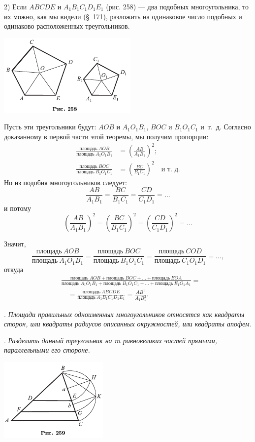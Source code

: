 \documentclass[oneside]{book}
\begin{document}
2) Если $ABCDE$ и $A_1B_1C_1D_1E_1$ (рис. 258) — два подобных многоугольника, то их можно, как мы видели (§~171), разложить на одинаковое число подобных и одинаково расположенных треугольников.

\includegraphics{pics/ris-258}

Пусть эти треугольники будут:
$AOB$ и $A_1O_1B_1$, $BOC$ и $B_1O_1C_1$ и~т.~д.
Согласно доказанному в первой части этой теоремы, мы получим пропорции:
\begin{align*}
\frac{\text{площадь}~AOB}{\text{площадь}~A_1O_1B_1}&=\left(\frac{AB}{A_1B_1}\right)^2;
\\
\frac{\text{площадь}~BOC}{\text{площадь}~B_1O_1C_1}&=\left(\frac{BC}{B_1C_1}\right)^2\quad\text{и т.~д.}
\end{align*}
Но из подобия многоугольников следует:
\[\frac{AB}{A_1B_1}=\frac{BC}{B_1C_1}=\frac{CD}{C_1D_1}=\dots\]
и потому
\[\left(\frac{AB}{A_1B_1}\right)^2=\left(\frac{BC}{B_1C_1}\right)^2=\left(\frac{CD}{C_1D_1}\right)^2=\dots\]

Значит,
\[\frac{\text{площадь}~AOB}{\text{площадь}~A_1O_1B_1}
=
\frac{\text{площадь}~BOC}{\text{площадь}~B_1O_1C_1}
=
\frac{\text{площадь}~COD}{\text{площадь}~C_1O_1D_1}=\dots,\]
откуда
\begin{align*}
&\frac{\text{площадь}~AOB+\text{площадь}~BOC+\dots+\text{площадь}~EOA}{\text{площадь}~A_1O_1B_1+\text{площадь}~B_1O_1C_1+\dots+\text{площадь}~E_1O_1A_1}
=
\\
&\quad=
\frac{\text{площадь}~ABCDE}{\text{площадь}~A_1B_1C_1D_1E_1}
=\frac{AB^1}{A_1B_1^2}.
\end{align*}

.
\emph{Площади правильных одноименных многоугольников относятся как квадраты сторон, или квадраты радиусов описанных окружностей, или квадраты апофем.}

.
\emph{Разделить данный треугольник на $m$ равновеликих частей прямыми, параллельными его стороне.}

\includegraphics{pics/ris-259}
\end{document}
